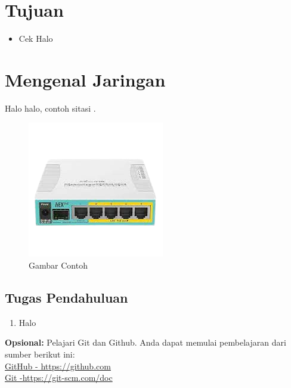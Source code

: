 \section{Tujuan}
\begin{itemize}[label=$\bullet$, itemsep=-1pt, leftmargin=*]
	\item Cek Halo
\end{itemize}

\section{Mengenal Jaringan}
Halo halo, contoh sitasi \cite{Newton1687}.

\begin{figure}[H]
	\centering
	\includegraphics[width=0.7\linewidth]{P1/img/contoh.png}
	\caption{Gambar Contoh}
	\label{fig:gambarcontoh}
\end{figure}

\subsection{Tugas Pendahuluan}
\begin{enumerate}
	\item Halo
\end{enumerate}


\begin{center}
	\colorbox{cyan!30}{\parbox{0.8\linewidth}{\textbf{Opsional:} Pelajari Git dan Github. Anda dapat memulai pembelajaran dari sumber berikut ini: \\ \href{https://github.com}{GitHub - https://github.com} \\ \href{https://git-scm.com/doc}{Git -https://git-scm.com/doc}}}
\end{center}